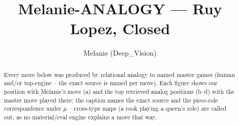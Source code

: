 \documentclass[11pt]{article}
\title{Melanie-ANALOGY — Ruy Lopez, Closed}
\author{Melanie (Deep\_Vision)}
\date{}
\begin{document}
\maketitle

\begin{abstract}Every move below was produced by relational analogy to named master games (human and/or top-engine -- the exact source is named per move). Each figure shows our position with Melanie's move (a) and the top retrieved analog positions (b--d) with the master move played there; the caption names the exact source and the piece-role correspondence under $\mu$ -- cross-type maps (a rook playing a queen's role) are called out, as no material/eval engine explains a move that way.\end{abstract}

\begin{figure}[p]\centering
\begin{subfigure}{0.46\textwidth}\centering
\resizebox{\linewidth}{!}{%
\newchessgame
\chessboard[
  setfen={r1bqk2r/2p1bppp/p1np1n2/1p2p3/4P3/1B3N2/PPPP1PPP/RNBQR1K1 w kq - 0 8},
  showmover=false,
  pgfstyle=straightmove, color=movearrow, markmove={b1-c3}
]}
\caption{}
\end{subfigure}\hfill
\begin{subfigure}{0.46\textwidth}\centering
\resizebox{\linewidth}{!}{%
\newchessgame
\chessboard[
  setfen={r1bqk2r/2p1bppp/p1np1n2/1p2p3/4P3/1B3N2/PPPP1PPP/RNBQR1K1 w kq - 0 8},
  showmover=false,
  pgfstyle=straightmove, color=movearrow, markmove={c2-c3}
]}
\caption{}
\end{subfigure}
\\[4pt]
\begin{subfigure}{0.46\textwidth}\centering
\resizebox{\linewidth}{!}{%
\newchessgame
\chessboard[
  setfen={r1bqk2r/2p1bppp/p1np1n2/1p2p3/4P3/1B3N2/PPPP1PPP/RNBQR1K1 w kq - 0 8},
  showmover=false,
  pgfstyle=straightmove, color=movearrow, markmove={c2-c3}
]}
\caption{}
\end{subfigure}\hfill
\begin{subfigure}{0.46\textwidth}\centering
\resizebox{\linewidth}{!}{%
\newchessgame
\chessboard[
  setfen={r1bqk2r/2p1bppp/p1np1n2/1p2p3/4P3/1B3N2/PPPP1PPP/RNBQR1K1 w kq - 2 8},
  showmover=false,
  pgfstyle=straightmove, color=movearrow, markmove={c2-c3}
]}
\caption{}
\end{subfigure}

\end{figure}
\end{document}
